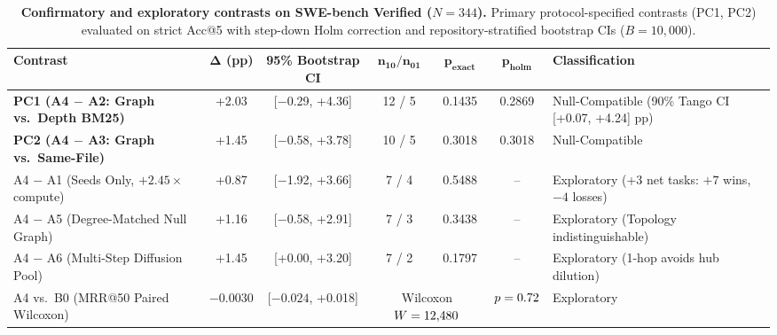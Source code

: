 \documentclass[10pt]{article}
\begin{document}
\begin{table}[!t]
\centering
\scriptsize
\setlength{\tabcolsep}{2.5pt}
\caption{\textbf{Confirmatory and exploratory contrasts on SWE-bench Verified ($N=344$).} Primary protocol-specified contrasts (PC1, PC2) evaluated on strict Acc@5 with step-down Holm correction and repository-stratified bootstrap CIs ($B=10{,}000$).}
\label{tab:confirmatory_contrasts}
\begin{tabular}{lccccc p{4.2cm}}
\toprule
\textbf{Contrast} & $\boldsymbol{\Delta}$ \textbf{(pp)} & \textbf{95\% Bootstrap CI} & $\boldsymbol{n_{10}} / \boldsymbol{n_{01}}$ & $\boldsymbol{p_{\text{exact}}}$ & $\boldsymbol{p_{\text{holm}}}$ & \textbf{Classification} \\
\midrule
\textbf{PC1 (A4 $-$ A2: Graph vs.\ Depth BM25)} & +2.03 & [$-$0.29, +4.36] & 12 / 5 & 0.1435 & 0.2869 & Null-Compatible (90\% Tango CI [+0.07, +4.24] pp) \\
\textbf{PC2 (A4 $-$ A3: Graph vs.\ Same-File)} & +1.45 & [$-$0.58, +3.78] & 10 / 5 & 0.3018 & 0.3018 & Null-Compatible \\
\midrule
A4 $-$ A1 (Seeds Only, $+2.45\times$ compute) & +0.87 & [$-$1.92, +3.66] & 7 / 4 & 0.5488 & -- & Exploratory (+3 net tasks: $+7$ wins, $-4$ losses) \\
A4 $-$ A5 (Degree-Matched Null Graph) & +1.16 & [$-$0.58, +2.91] & 7 / 3 & 0.3438 & -- & Exploratory (Topology indistinguishable) \\
A4 $-$ A6 (Multi-Step Diffusion Pool) & +1.45 & [+0.00, +3.20] & 7 / 2 & 0.1797 & -- & Exploratory (1-hop avoids hub dilution) \\
A4 vs.\ B0 (MRR@50 Paired Wilcoxon) & $-0.0030$ & [$-0.024$, +0.018] & \multicolumn{2}{c}{Wilcoxon $W=12{,}480$} & $p= 0.72$ & Exploratory \\
\bottomrule
\end{tabular}
\end{table}
\end{document}
